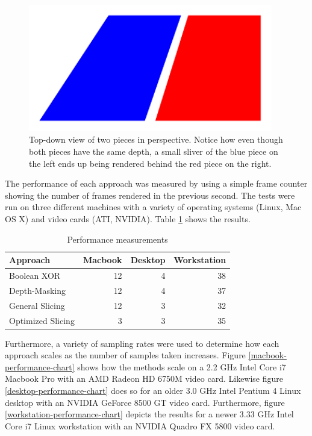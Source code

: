 \documentclass{report}
\begin{document}
\begin{figure}
\centering
\includegraphics[width=0.95\textwidth]{pieces-in-perspective.pdf}
\caption{Top-down view of two pieces in perspective.  Notice how even though
both pieces have the same depth, a small sliver of the blue piece on the left
ends up being rendered behind the red piece on the right.}
\label{pieces-in-perspective}
\end{figure}

The performance of each approach was measured by using a simple frame counter
showing the number of frames rendered in the previous second.  The tests were
run on three different machines with a variety of operating systems (Linux, Mac
OS X) and video cards (ATI, NVIDIA).  Table \ref{performance-table} shows the
results.

\begin{table}
  \centering
  \begin{tabular}{ l r r r }
    \toprule
    Approach & Macbook & Desktop & Workstation\\
    \midrule
    Boolean XOR & 12 & 4 & 38 \\
    Depth-Masking & 12 & 4 & 37 \\
    General Slicing & 12 & 3 & 32 \\
    Optimized Slicing & 3 & 3 & 35 \\
    \bottomrule
  \end{tabular}
  \caption{Performance measurements}
  \label{performance-table}
\end{table}

Furthermore, a variety of sampling rates were used to determine how each
approach scales as the number of samples taken increases.  Figure
\ref{macbook-performance-chart} shows how the methods scale on a 2.2 GHz Intel
Core i7 Macbook Pro with an AMD Radeon HD 6750M video card.  Likewise figure
\ref{desktop-performance-chart} does so for an older 3.0 GHz Intel Pentium 4
Linux desktop with an NVIDIA GeForce 8500 GT video card.  Furthermore, figure
\ref{workstation-performance-chart} depicts the results for a newer 3.33 GHz
Intel Core i7 Linux workstation with an NVIDIA Quadro FX 5800 video card.
\end{document}

